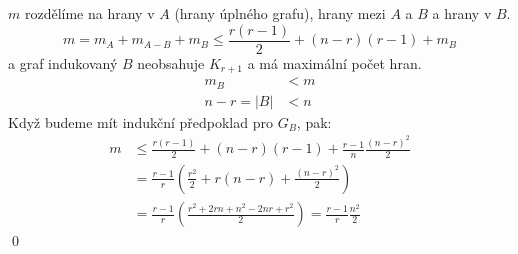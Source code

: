 $m$ rozdělíme na \colorbox{blue!30}{hrany v $A$ (hrany úplného grafu)}, \colorbox{black!30}{hrany mezi $A$ a $B$} a 
\colorbox{black!20!yellow}{hrany v $B$}.
\begin{equation}
    m = m_A + m_{A-B} + m_B \leq \frac{r(r-1)}{2} + (n-r)(r-1) + m_B
\end{equation}
a graf indukovaný $B$ neobsahuje $K_{r+1}$ a má maximální počet hran.
\begin{align*}
    m_B &< m \\
    n-r = |B| &< n
\end{align*}
Když budeme mít indukční předpoklad pro $G_B$, pak:
\begin{align}
    m &\leq \frac{r(r-1)}{2} + (n-r)(r-1) + \frac{r-1}{n}\frac{(n-r)^2}{2} \\
    &= \frac{r-1}{r}\left(\frac{r^2}{2} + r(n-r) + \frac{(n-r)^2}{2}\right) \\
    &= \frac{r-1}{r}\left(\frac{r^2 + 2rn + n^2 -2nr + r^2}{2}\right) = \frac{r-1}{r} \frac{n^2}{2}
\end{align}
\hspace{\fill}\qed